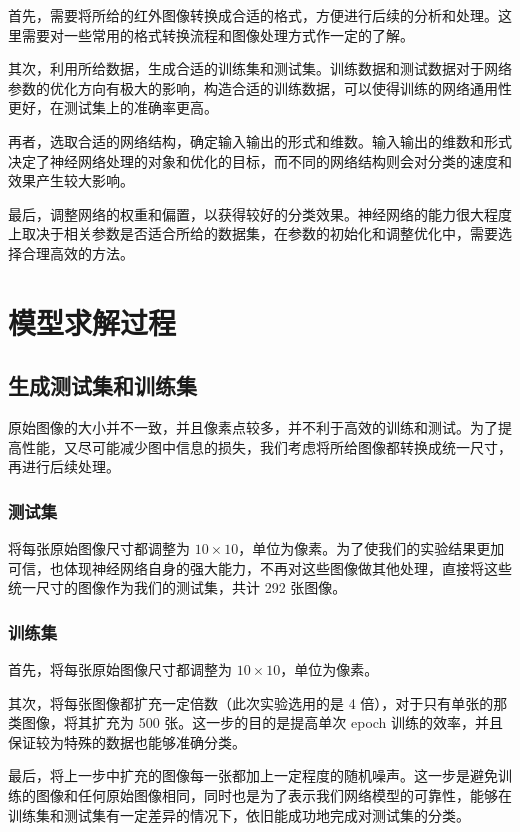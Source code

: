 \documentclass[a4paper, 12pt]{article}
\begin{document}
首先，需要将所给的红外图像转换成合适的格式，方便进行后续的分析和处理。这里需要对一些常用的格式转换流程和图像处理方式作一定的了解。

其次，利用所给数据，生成合适的训练集和测试集。训练数据和测试数据对于网络参数的优化方向有极大的影响，构造合适的训练数据，可以使得训练的网络通用性更好，在测试集上的准确率更高。

再者，选取合适的网络结构，确定输入输出的形式和维数。输入输出的维数和形式决定了神经网络处理的对象和优化的目标，而不同的网络结构则会对分类的速度和效果产生较大影响。

最后，调整网络的权重和偏置，以获得较好的分类效果。神经网络的能力很大程度上取决于相关参数是否适合所给的数据集，在参数的初始化和调整优化中，需要选择合理高效的方法。



\section{模型求解过程}

\subsection{生成测试集和训练集}

原始图像的大小并不一致，并且像素点较多，并不利于高效的训练和测试。为了提高性能，又尽可能减少图中信息的损失，我们考虑将所给图像都转换成统一尺寸，再进行后续处理。

\subsubsection{测试集}

将每张原始图像尺寸都调整为 $10 \times 10$，单位为像素。为了使我们的实验结果更加可信，也体现神经网络自身的强大能力，不再对这些图像做其他处理，直接将这些统一尺寸的图像作为我们的测试集，共计 292 张图像。

\subsubsection{训练集}

首先，将每张原始图像尺寸都调整为 $10 \times 10$，单位为像素。

其次，将每张图像都扩充一定倍数（此次实验选用的是 4 倍），对于只有单张的那类图像，将其扩充为 500 张。这一步的目的是提高单次 epoch 训练的效率，并且保证较为特殊的数据也能够准确分类。

最后，将上一步中扩充的图像每一张都加上一定程度的随机噪声。这一步是避免训练的图像和任何原始图像相同，同时也是为了表示我们网络模型的可靠性，能够在训练集和测试集有一定差异的情况下，依旧能成功地完成对测试集的分类。
\end{document}
